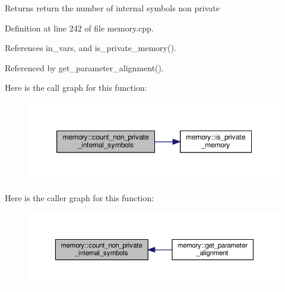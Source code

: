 \begin{DoxyReturn}{Returns}
return the number of internal symbols non private 
\end{DoxyReturn}


Definition at line 242 of file memory.\+cpp.



References in\+\_\+vars, and is\+\_\+private\+\_\+memory().



Referenced by get\+\_\+parameter\+\_\+alignment().

Here is the call graph for this function\+:
\nopagebreak
\begin{figure}[H]
\begin{center}
\leavevmode
\includegraphics[width=350pt]{d8/d99/classmemory_a65a07e87ed6884cc67998454ed50fb72_cgraph}
\end{center}
\end{figure}
Here is the caller graph for this function\+:
\nopagebreak
\begin{figure}[H]
\begin{center}
\leavevmode
\includegraphics[width=350pt]{d8/d99/classmemory_a65a07e87ed6884cc67998454ed50fb72_icgraph}
\end{center}
\end{figure}
\mbox{\label{classmemory_a169a0772cd5c322a06f7f433cb9c27af}} 

